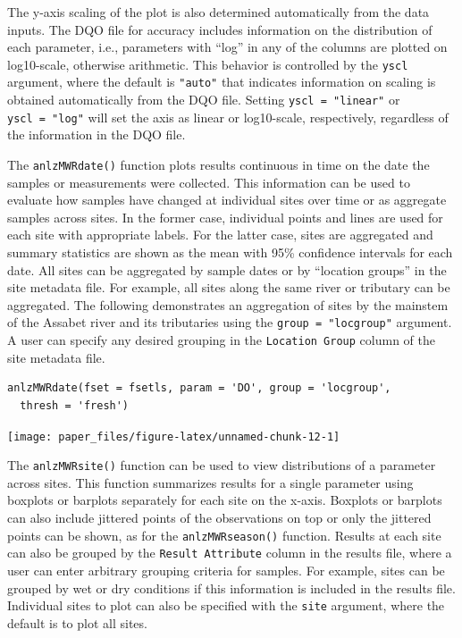 The y-axis scaling of the plot is also determined automatically from the data inputs. The DQO file for accuracy includes information on the distribution of each parameter, i.e., parameters with ``log'' in any of the columns are plotted on log10-scale, otherwise arithmetic. This behavior is controlled by the \texttt{yscl} argument, where the default is \texttt{"auto"} that indicates information on scaling is obtained automatically from the DQO file. Setting \texttt{yscl\ =\ "linear"} or \texttt{yscl\ =\ "log"} will set the axis as linear or log10-scale, respectively, regardless of the information in the DQO file.

The \texttt{anlzMWRdate()} function plots results continuous in time on the date the samples or measurements were collected. This information can be used to evaluate how samples have changed at individual sites over time or as aggregate samples across sites. In the former case, individual points and lines are used for each site with appropriate labels. For the latter case, sites are aggregated and summary statistics are shown as the mean with 95\% confidence intervals for each date. All sites can be aggregated by sample dates or by ``location groups'' in the site metadata file. For example, all sites along the same river or tributary can be aggregated. The following demonstrates an aggregation of sites by the mainstem of the Assabet river and its tributaries using the \texttt{group\ =\ "locgroup"} argument. A user can specify any desired grouping in the \texttt{Location\ Group} column of the site metadata file.

\begin{verbatim}
anlzMWRdate(fset = fsetls, param = 'DO', group = 'locgroup', 
  thresh = 'fresh')
\end{verbatim}

\begin{center}\texttt{[image: paper\_files/figure-latex/unnamed-chunk-12-1]} \end{center}

The \texttt{anlzMWRsite()} function can be used to view distributions of a parameter across sites. This function summarizes results for a single parameter using boxplots or barplots separately for each site on the x-axis. Boxplots or barplots can also include jittered points of the observations on top or only the jittered points can be shown, as for the \texttt{anlzMWRseason()} function. Results at each site can also be grouped by the \texttt{Result\ Attribute} column in the results file, where a user can enter arbitrary grouping criteria for samples. For example, sites can be grouped by wet or dry conditions if this information is included in the results file. Individual sites to plot can also be specified with the \texttt{site} argument, where the default is to plot all sites.

